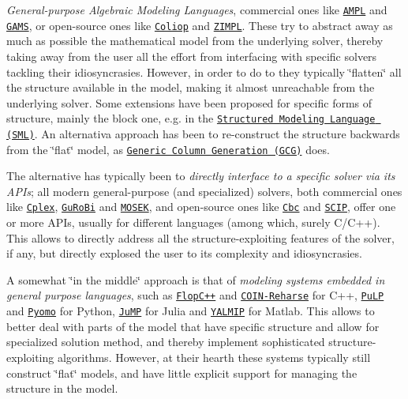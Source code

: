 \begin{DoxyItemize}
\item {\itshape General-\/purpose Algebraic Modeling Languages}, commercial ones like \href{https://ampl.com}{\tt A\+M\+PL} and \href{https://www.gams.co/}{\tt G\+A\+MS}, or open-\/source ones like \href{http://www.coliop.org}{\tt Coliop} and \href{http://zimpl.zib.de}{\tt Z\+I\+M\+PL}. These try to abstract away as much as possible the mathematical model from the underlying solver, thereby taking away from the user all the effort from interfacing with specific solvers tackling their idiosyncrasies. However, in order to do to they typically \char`\"{}flatten\char`\"{} all the structure available in the model, making it almost unreachable from the underlying solver. Some extensions have been proposed for specific forms of structure, mainly the block one, e.\+g. in the \href{https://www.maths.ed.ac.uk/ERGO/sml}{\tt Structured Modeling Language (S\+ML)}. An alternativa approach has been to re-\/construct the structure backwards from the \char`\"{}flat\char`\"{} model, as \href{http://www.or.rwth-aachen.de/gcg}{\tt Generic Column Generation (G\+CG)} does.
\item The alternative has typically been to {\itshape directly interface to a specific solver via its A\+P\+Is}; all modern general-\/purpose (and specialized) solvers, both commercial ones like \href{https://www.ibm.com/analytics/cplex-optimizer}{\tt Cplex}, \href{http://www.gurobi.com}{\tt Gu\+Ro\+Bi} and \href{https://www.mosek.com}{\tt M\+O\+S\+EK}, and open-\/source ones like \href{https://projects.coin-or.org/Cbc}{\tt Cbc} and \href{http://scip.zib.de}{\tt S\+C\+IP}, offer one or more A\+P\+Is, usually for different languages (among which, surely C/\+C++). This allows to directly address all the structure-\/exploiting features of the solver, if any, but directly explosed the user to its complexity and idiosyncrasies.
\item A somewhat \char`\"{}in the middle\char`\"{} approach is that of {\itshape modeling systems embedded in general purpose languages}, such as \href{https://projects.coin-or.org/FlopC++}{\tt Flop\+C++} and \href{https://github.com/coin-or/Rehearse}{\tt C\+O\+I\+N-\/\+Reharse} for C++, \href{https://pythonhosted.org/PuLP}{\tt Pu\+LP} and \href{http://www.pyomo.org}{\tt Pyomo} for Python, \href{https://github.com/JuliaOpt/JuMP.jl}{\tt Ju\+MP} for Julia and \href{https://yalmip.github.io}{\tt Y\+A\+L\+M\+IP} for Matlab. This allows to better deal with parts of the model that have specific structure and allow for specialized solution method, and thereby implement sophisticated structure-\/exploiting algorithms. However, at their hearth these systems typically still construct \char`\"{}flat\char`\"{} models, and have little explicit support for managing the structure in the model.
\end{DoxyItemize}

